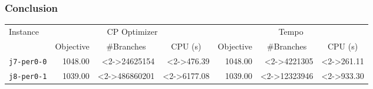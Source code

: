 
\begin{frame}
\frametitle{Conclusion}


\vfill

\begin{footnotesize}
\begin{tabular}{lrrrrrr}
\toprule
\multirow{2}{*}{Instance}&  \multicolumn{3}{c}{CP Optimizer} & \multicolumn{3}{c}{Tempo}\\
\cmidrule(rr){2-4}\cmidrule(rr){5-7}
& \multicolumn{1}{c}{Objective} & \multicolumn{1}{c}{\#Branches} & \multicolumn{1}{c}{CPU (s)} & 
\multicolumn{1}{c}{Objective} & \multicolumn{1}{c}{\#Branches} & \multicolumn{1}{c}{CPU (s)} \\
\midrule

\texttt{j7-per0-0} & 1048.00 & \cellcolor{red!50}<2->{24625154} & \cellcolor{red!50}<2->{476.39} & 1048.00 & \cellcolor{green!50}<2->{4221305} & \cellcolor{green!50}<2->{261.11}\\
\texttt{j8-per0-1} & 1039.00 & \cellcolor{red!50}<2->{486860201} & \cellcolor{red!50}<2->{6177.08} & 1039.00 & \cellcolor{green!50}<2->{12323946} & \cellcolor{green!50}<2->{933.30}\\

\bottomrule
\end{tabular}
\end{footnotesize}

\vfill


\vfill

\end{frame}


